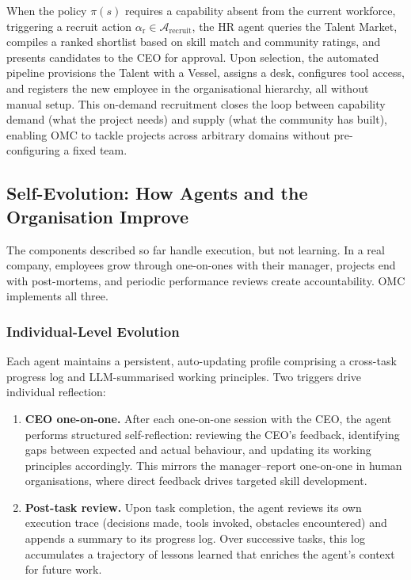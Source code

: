 \documentclass[11pt,a4paper]{article}
\begin{document}
When the policy $\pi(s)$ requires a capability absent from the current workforce, triggering a recruit action $\alpha_{\text{r}} \in \mathcal{A}_{\text{recruit}}$, the HR agent queries the Talent Market, compiles a ranked shortlist based on skill match and community ratings, and presents candidates to the CEO for approval.  Upon selection, the automated pipeline provisions the Talent with a Vessel, assigns a desk, configures tool access, and registers the new employee in the organisational hierarchy, all without manual setup.  This on-demand recruitment closes the loop between capability demand (what the project needs) and supply (what the community has built), enabling OMC to tackle projects across arbitrary domains without pre-configuring a fixed team.


\subsection{Self-Evolution: How Agents and the Organisation Improve}
\label{sec:self-evolution}

The components described so far handle execution, but not learning.  In a real company, employees grow through one-on-ones with their manager, projects end with post-mortems, and periodic performance reviews create accountability.  OMC implements all three.

\subsubsection{Individual-Level Evolution}

Each agent maintains a persistent, auto-updating profile comprising a cross-task progress log and LLM-summarised working principles.  Two triggers drive individual reflection:

\begin{enumerate}[nosep]
    \item \textbf{CEO one-on-one.}  After each one-on-one session with the CEO, the agent performs structured self-reflection: reviewing the CEO's feedback, identifying gaps between expected and actual behaviour, and updating its working principles accordingly.  This mirrors the manager--report one-on-one in human organisations, where direct feedback drives targeted skill development.
    \item \textbf{Post-task review.}  Upon task completion, the agent reviews its own execution trace (decisions made, tools invoked, obstacles encountered) and appends a summary to its progress log.  Over successive tasks, this log accumulates a trajectory of lessons learned that enriches the agent's context for future work.
\end{enumerate}
\end{document}
